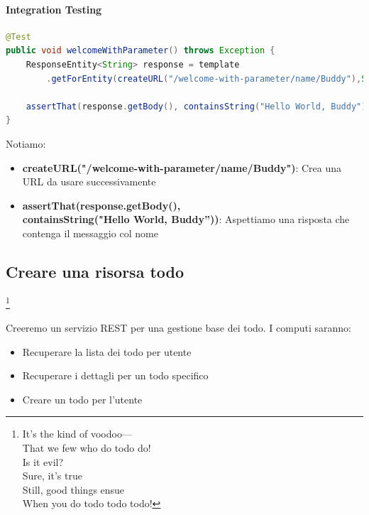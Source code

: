 \documentclass[11pt,a4paper]{book}
\begin{document}
\paragraph{Integration Testing}
\begin{lstlisting}[language = Java]
@Test
public void welcomeWithParameter() throws Exception {
	ResponseEntity<String> response = template
		.getForEntity(createURL("/welcome-with-parameter/name/Buddy"),String.class);
	
	assertThat(response.getBody(), containsString("Hello World, Buddy"));
}
\end{lstlisting}

Notiamo:
\begin{itemize}
	\item \textbf{createURL("/welcome-with-parameter/name/Buddy")}: Crea una URL da usare successivamente
	\item \textbf{assertThat(response.getBody(), \\
		containsString("Hello World, Buddy”))}: Aspettiamo una risposta che contenga il messaggio col nome
\end{itemize}

\subsection{Creare una risorsa todo}\footnote{It's the kind of voodoo— \\
That we few who do todo do! \\
Is it evil? \\
Sure, it's true \\
Still, good things ensue \\
When you do todo todo todo!}

Creeremo un servizio REST per una gestione base dei todo. I computi saranno:
\begin{itemize}
	\item Recuperare la lista dei todo per utente
	\item Recuperare i dettagli per un todo specifico
	\item Creare un todo per l'utente
\end{itemize}
\end{document}
